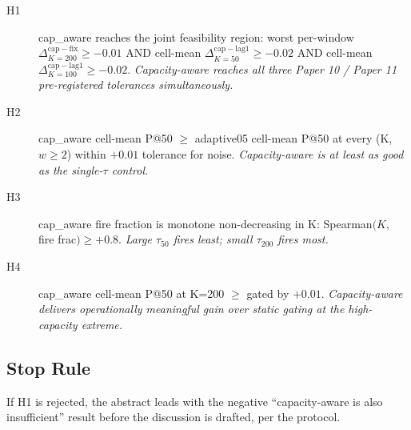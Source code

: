 \begin{description}
\item[H1] \textsf{cap\_aware} reaches the joint feasibility region:
worst per-window $\Delta^{\mathrm{cap-fix}}_{K=200} \geq -0.01$
AND cell-mean $\Delta^{\mathrm{cap-lag1}}_{K=50} \geq -0.02$
AND cell-mean $\Delta^{\mathrm{cap-lag1}}_{K=100} \geq -0.02$.
\textit{Capacity-aware reaches all three Paper 10 / Paper 11
pre-registered tolerances simultaneously.}
\item[H2] \textsf{cap\_aware} cell-mean P@50 $\geq$
\textsf{adaptive05} cell-mean P@50 at every (K, $w \geq 2$) within
$+0.01$ tolerance for noise. \textit{Capacity-aware is at least as
good as the single-$\tau$ control.}
\item[H3] \textsf{cap\_aware} fire fraction is monotone non-decreasing
in K: Spearman$(K, $ fire frac$) \geq +0.8$. \textit{Large $\tau_{50}$
fires least; small $\tau_{200}$ fires most.}
\item[H4] \textsf{cap\_aware} cell-mean P@50 at K=200 $\geq$
\textsf{gated} by $+0.01$. \textit{Capacity-aware delivers
operationally meaningful gain over static gating at the high-capacity
extreme.}
\end{description}

\subsection{Stop Rule}

If H1 is rejected, the abstract leads with the negative
``capacity-aware is also insufficient'' result before the discussion
is drafted, per the protocol.
